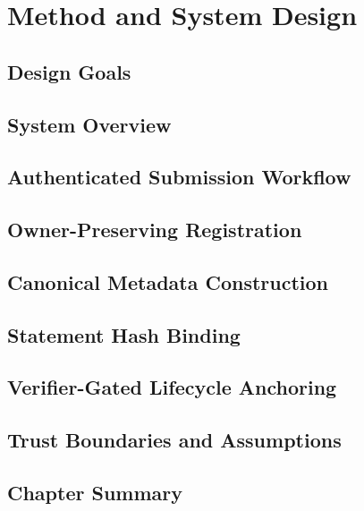 \chapter{Method and System Design}
\section{Design Goals}
\section{System Overview}
\section{Authenticated Submission Workflow}
\section{Owner-Preserving Registration}
\section{Canonical Metadata Construction}
\section{Statement Hash Binding}
\section{Verifier-Gated Lifecycle Anchoring}
\section{Trust Boundaries and Assumptions}
\section{Chapter Summary}
